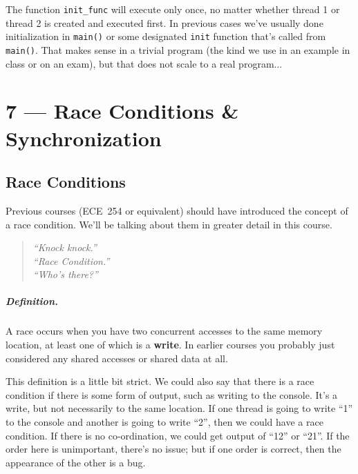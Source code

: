 \documentclass[a4paper]{report}
\begin{document}
The function \texttt{init\_func} will execute only once, no matter whether thread 1 or thread 2 is created and executed first. In previous cases we've usually done initialization in \texttt{main()} or some designated \texttt{init} function that's called from \texttt{main()}. That makes sense in a trivial program (the kind we use in an example in class or on an exam), but that does not scale to a real program...









\chapter*{7 --- Race Conditions \& Synchronization}



\section*{Race Conditions}
Previous courses (ECE~254 or equivalent) should have introduced the concept of a race condition. We'll be talking about them in greater detail in this course.

\begin{quote}
\textit{
	``Knock knock.''\\
	``Race Condition.''\\
	``Who's there?''
	}
\end{quote}

\paragraph{Definition.} A race occurs when you have two concurrent accesses to the
same memory location, at least one of which is a {\bf write}. In earlier courses you probably just considered any shared accesses or shared data at all. 

This definition is a little bit strict. We could also say that there is a race condition if there is some form of output, such as writing to the console. It's a write, but not necessarily to the same location. If one thread is going to write ``1'' to the console and another is going to write ``2'', then we could have a race condition. If there is no co-ordination, we could get output of ``12'' or ``21''. If the order here is unimportant, there's no issue; but if one order is correct, then the appearance of the other is a bug.
\end{document}
